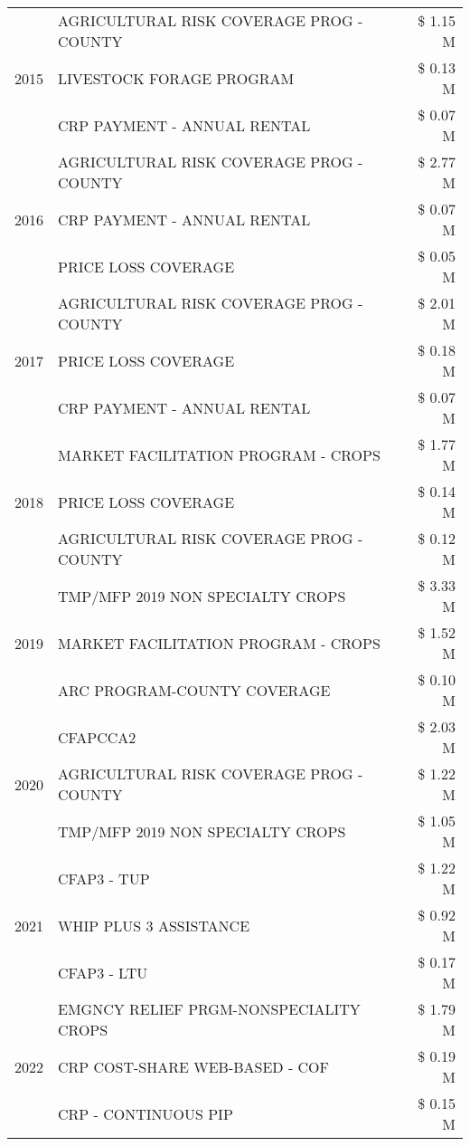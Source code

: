\begin{tabular}{llr}
\cline{1-3}
\multirow[t]{3}{*}{2015} & AGRICULTURAL RISK COVERAGE PROG - COUNTY & \$ 1.15 M \\
 & LIVESTOCK FORAGE PROGRAM & \$ 0.13 M \\
 & CRP PAYMENT - ANNUAL RENTAL & \$ 0.07 M \\
\cline{1-3}
\multirow[t]{3}{*}{2016} & AGRICULTURAL RISK COVERAGE PROG - COUNTY & \$ 2.77 M \\
 & CRP PAYMENT - ANNUAL RENTAL & \$ 0.07 M \\
 & PRICE LOSS COVERAGE & \$ 0.05 M \\
\cline{1-3}
\multirow[t]{3}{*}{2017} & AGRICULTURAL RISK COVERAGE PROG - COUNTY & \$ 2.01 M \\
 & PRICE LOSS COVERAGE & \$ 0.18 M \\
 & CRP PAYMENT - ANNUAL RENTAL & \$ 0.07 M \\
\cline{1-3}
\multirow[t]{3}{*}{2018} & MARKET FACILITATION PROGRAM - CROPS & \$ 1.77 M \\
 & PRICE LOSS COVERAGE & \$ 0.14 M \\
 & AGRICULTURAL RISK COVERAGE PROG - COUNTY & \$ 0.12 M \\
\cline{1-3}
\multirow[t]{3}{*}{2019} & TMP/MFP 2019 NON SPECIALTY CROPS & \$ 3.33 M \\
 & MARKET FACILITATION PROGRAM - CROPS & \$ 1.52 M \\
 & ARC PROGRAM-COUNTY COVERAGE & \$ 0.10 M \\
\cline{1-3}
\multirow[t]{3}{*}{2020} & CFAPCCA2 & \$ 2.03 M \\
 & AGRICULTURAL RISK COVERAGE PROG - COUNTY & \$ 1.22 M \\
 & TMP/MFP 2019 NON SPECIALTY CROPS & \$ 1.05 M \\
\cline{1-3}
\multirow[t]{3}{*}{2021} & CFAP3 - TUP & \$ 1.22 M \\
 & WHIP PLUS 3 ASSISTANCE & \$ 0.92 M \\
 & CFAP3 - LTU & \$ 0.17 M \\
\cline{1-3}
\multirow[t]{3}{*}{2022} & EMGNCY RELIEF PRGM-NONSPECIALITY CROPS & \$ 1.79 M \\
 & CRP COST-SHARE WEB-BASED - COF & \$ 0.19 M \\
 & CRP - CONTINUOUS PIP & \$ 0.15 M \\
\cline{1-3}
\bottomrule
\end{tabular}

